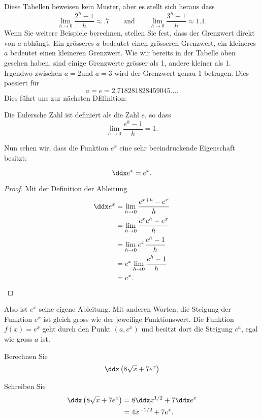 Diese Tabellen beweisen kein Muster, aber es stellt sich heraus dass
\[
\lim_{h\to 0}\frac{2^h-1}{h} \approx .7 \qquad\text{and}\qquad \lim_{h\to 0} \frac{3^h-1}{h} \approx 1.1.
\]
Wenn Sie weitere Beispiele berechnen, stellen Sie fest, dass der Grenzwert direkt von $a$ abhängt. Ein grösseres $a$ bedeutet einen grösseren Grenzwert, ein kleineres $a$ bedeutet einen kleineren Grenzwert.
Wie wir bereits in der Tabelle oben gesehen haben, sind einige Grenzwerte grösser als 1, andere kleiner als 1. Irgendwo zwischen $a=2$und $a=3$ wird der Grenzwert genau 1 betragen. Dies passiert für
\[
a = e = 2.718281828459045\dots.
\]
Dies führt uns zur nächsten DEfinition:
\begin{definition}
Die Eulersche Zahl ist definiert als die Zahl $e$, so dass
\[
\lim_{h\to 0} \frac{e^h-1}{h} = 1.
\]
\end{definition}
Nun sehen wir, dass die Funktion $e^x$ eine  sehr beeindruckende Eigenschaft besitzt:

\begin{mainTheorem}
\[
\ddx e^x = e^x.
\]
\end{mainTheorem}
\begin{proof}  
Mit der Definition der Ableitung
\begin{align*}
\ddx e^x&=\lim_{h\to 0} \frac{e^{x+h}-e^x}{h} \\
&=\lim_{h\to 0} \frac{e^xe^{h}-e^x}{h} \\
&=\lim_{h\to 0} e^x\frac{e^{h}-1}{h} \\
&=e^x\lim_{h\to 0} \frac{e^{h}-1}{h} \\
&=e^x.
\end{align*}
\end{proof}


Also ist $e^x$ seine eigene Ableitung. Mit anderen Worten; die Steigung der Funktion $e^x$ ist gleich gross wie der jeweilige Funktionswert. Die Funktion $f(x)=e^x$ geht durch den Punkt $(a,e^x)$ und besitzt dort die Steigung $e^a$, egal wie gross $a$ ist.
 



\begin{example}
Berechnen Sie
\[
\ddx\left(8\sqrt{x} + 7e^x \right)
\]
\end{example}

\begin{solution}
Schreiben Sie
\begin{align*}
\ddx\left(8\sqrt{x} + 7e^x \right) &= 8\ddx x^{1/2} + 7\ddx e^x\\
&= 4x^{-1/2} + 7 e^x.
\end{align*}
\end{solution}


